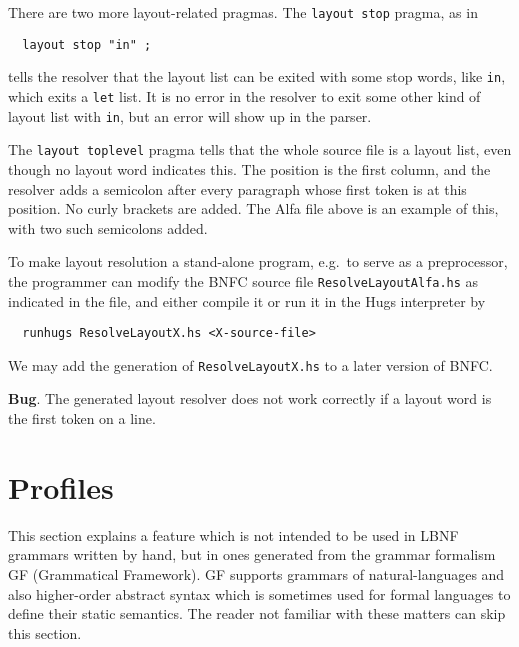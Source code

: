 \documentclass[10pt]{article}
\begin{document}
There are two more layout-related pragmas. The {\tt layout stop}
pragma, as in
\begin{verbatim}
  layout stop "in" ;
\end{verbatim}
tells the resolver that the layout list can be exited with
some stop words, like {\tt in}, which exits a
{\tt let} list. It is no error in the resolver to exit
some other kind of layout list with {\tt in}, but an error will show up
in the parser.

The {\tt layout toplevel} pragma tells that the whole source file
is a layout list, even though no layout word indicates this.
The position is the first column, and the resolver adds a semicolon
after every paragraph whose first token is at this position. No curly
brackets are added. The Alfa file above is an example of this, with
two such semicolons added.

To make layout resolution a stand-alone program, e.g.\ to serve as a
preprocessor, the programmer can modify the BNFC source file
{\tt ResolveLayoutAlfa.hs} as indicated in the file,
and either compile it or run it in the Hugs interpreter by
\begin{verbatim}
  runhugs ResolveLayoutX.hs <X-source-file>
\end{verbatim}
We may add the generation of {\tt ResolveLayoutX.hs}
to a later version of BNFC.

{\bf Bug}. The generated layout resolver does not work correctly
if a layout word is the first token on a line.


\section{Profiles}
\label{profile}

This section explains a feature which is not intended to be used
in LBNF grammars written by hand, but in ones generated from
the grammar formalism GF (Grammatical Framework).
GF supports grammars of natural-languages
and also higher-order abstract syntax which is sometimes used for 
formal languages to define their static semantics.
The reader not familiar with these matters can skip this section.
\end{document}
